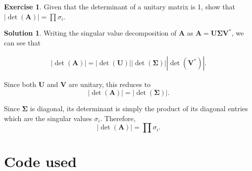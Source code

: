 \documentclass[12pt]{article}
\newcommand{\abs}[1]{ \left| #1 \right| }
\renewcommand{\vec}[1]{\mathbf{#1}}
\theoremstyle{definition}
\newtheorem{exer}{Exercise}
\newtheorem{sol}{Solution}
\theoremstyle{remark}
\begin{document}
\begin{exer}
    Given that the determinant of a unitary matrix is 1, show that $\abs{\det (\vec{A})} = \prod \sigma_i$.
\end{exer}

\begin{sol}
    Writing the singular value decomposition of $\vec{A}$ as $\vec{A} = \vec{U}\vec{\Sigma}\vec{V}^*$, we can see that

    \begin{align}
    \abs{\det(\vec{A})} = \abs{\det(\vec{U})} \abs{\det(\vec{\Sigma})} \abs{\det(\vec{V}^*)}.   
    \end{align}

Since both $\vec{U}$ and $\vec{V}$ are unitary, this reduces to
\begin{equation}
    \abs{\det(\vec{A})} = \abs{\det(\vec{\Sigma})}. 
\end{equation}

Since $\vec{\Sigma}$ is diagonal, its determinant is simply the product of its diagonal entries which are the singular values $\sigma_i$. Therefore,
\begin{equation}
    \abs{\det(\vec{A})} = \prod \sigma_i. 
\end{equation}
\end{sol}

\newpage
\section*{Code used}%
\label{sec:code_used}

\inputminted{julia}{HW-2-Code-Figgins.jl}
\end{document}
